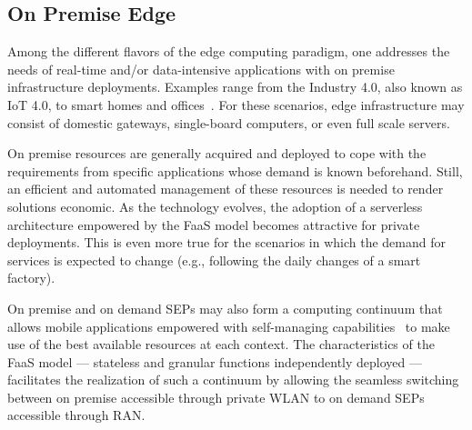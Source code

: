 \subsection{On Premise Edge}

Among the 
different flavors of the edge computing paradigm, one addresses the needs of real-time and/or data-intensive applications with on premise infrastructure deployments. Examples range from the Industry 4.0, also known as IoT 4.0, to
smart homes and offices~\cite{Porambage:2018}. For these scenarios, edge infrastructure may consist of domestic gateways, single-board computers, or even full scale servers.

On premise resources are generally acquired and deployed to cope with the requirements from specific applications whose demand is known beforehand. Still, an efficient and automated management of these resources is needed to render solutions economic. As the technology evolves, the adoption of a serverless architecture empowered by the FaaS model becomes attractive for private deployments. This is even more true for the scenarios in which the demand for services is expected to change (e.g., following the daily changes of a smart factory). 


On premise and on demand SEPs may also form a computing continuum that allows mobile applications empowered with self-managing capabilities~\cite{OrsiniBL16,Baresi:2018} to make use of the best available resources at each context. The characteristics of the FaaS model --- stateless and granular functions independently deployed --- facilitates the realization of such a continuum by allowing the seamless switching between on premise accessible through private WLAN to on demand SEPs accessible through RAN. %




